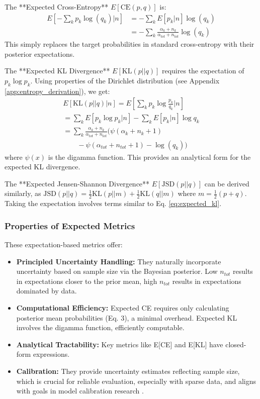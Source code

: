 \documentclass[journal]{IEEEtran}
\begin{document}
The **Expected Cross-Entropy** $E[\text{CE}(p,q)]$ is:
\begin{equation}
\begin{split}
E[-\sum_k p_k \log(q_k) | n] &= -\sum_k E[p_k|n] \log(q_k) \\
 &= -\sum_k \frac{\alpha_k + n_k}{\alpha_{tot} + n_{tot}}\log(q_k)
\end{split}
\end{equation}
This simply replaces the target probabilities in standard cross-entropy with their posterior expectations.

The **Expected KL Divergence** $E[\text{KL}(p||q)]$ requires the expectation of $p_k \log p_k$. Using properties of the Dirichlet distribution (see Appendix \ref{app:entropy_derivation}), we get:
\begin{equation}
\label{eq:expected_kl}
\begin{split}
E[\text{KL}(p||q) | n] = E[\sum_k p_k \log \frac{p_k}{q_k} | n] \\
= \sum_k E[p_k \log p_k | n] - \sum_k E[p_k | n] \log q_k \\
= \sum_k \frac{\alpha_k + n_k}{\alpha_{tot} + n_{tot}} \Big( \psi(\alpha_k + n_k + 1) \\
 \qquad - \psi(\alpha_{tot} + n_{tot} + 1) - \log(q_k) \Big)
\end{split}
\end{equation}
where $\psi(x)$ is the digamma function. This provides an analytical form for the expected KL divergence.

The **Expected Jensen-Shannon Divergence** $E[\text{JSD}(p||q)]$ can be derived similarly, as $\text{JSD}(p||q) = \frac{1}{2} \text{KL}(p||m) + \frac{1}{2} \text{KL}(q||m)$ where $m = \frac{1}{2}(p+q)$. Taking the expectation involves terms similar to Eq. \ref{eq:expected_kl}.

\subsubsection{Properties of Expected Metrics}
These expectation-based metrics offer:
\begin{itemize}
    \item \textbf{Principled Uncertainty Handling:} They naturally incorporate uncertainty based on sample size via the Bayesian posterior. Low $n_{tot}$ results in expectations closer to the prior mean, high $n_{tot}$ results in expectations dominated by data.
    \item \textbf{Computational Efficiency:} Expected CE requires only calculating posterior mean probabilities (Eq. 3), a minimal overhead. Expected KL involves the digamma function, efficiently computable.
    \item \textbf{Analytical Tractability:} Key metrics like E[CE] and E[KL] have closed-form expressions.
    \item \textbf{Calibration:} They provide uncertainty estimates reflecting sample size, which is crucial for reliable evaluation, especially with sparse data, and aligns with goals in model calibration research \cite{guo2017}.
\end{itemize}
\end{document}
